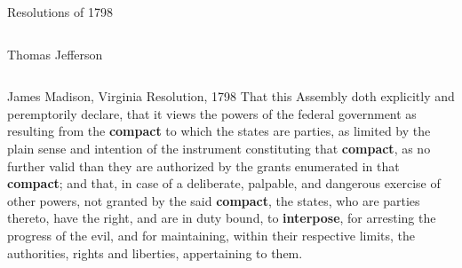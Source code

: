 \begin{frame}{Resolutions of 1798}
\begin{columns}[c]
            { \tiny Thomas Jefferson \\ }
    \end{columns}
\end{frame}

\begin{frame}{James Madison, Virginia Resolution, 1798}
    That this Assembly doth explicitly and peremptorily declare, that it views
    the powers of the federal government as resulting from the \textbf{
    \color{blue}compact} to which the states are parties, as limited by
    the plain sense and intention of the instrument constituting that
    \textbf{\color{blue}compact}, as no further valid than they are
    authorized by the grants enumerated in that\textbf{ \color{blue}
    compact}; and that, in case of a deliberate, palpable, and dangerous
    exercise of other powers, not granted by the said\textbf{ \color{blue}
    compact}, the states, who are parties thereto, have the right, and are
    in duty bound, to\textbf{ \color{red}interpose}, for arresting the
    progress of the evil, and for maintaining, within their respective
    limits, the authorities, rights and liberties, appertaining to them.  
\end{frame}

